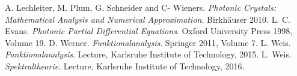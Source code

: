 \begin{thebibliography}{00}
   A. Lechleiter, M. Plum, G. Schneider and C- Wieners. {\it Photonic Crystals: Mathematical Analysis and Numerical Approximation}. Birkh{\"a}user 2010.
   L. C. Evans. {\it Photonic Partial Differential Equations}. Oxford University Press 1998, Volume 19.
   D. Werner. {\it Funktionalanalysis}. Springer 2011, Volume 7.
   L. Weis. {\it Funktionalanalysis}. Lecture, Karlsruhe Institute of Technology, 2015.
   L. Weis. {\it Spektraltheorie}. Lecture, Karlsruhe Institute of Technology, 2016.
\end{thebibliography}